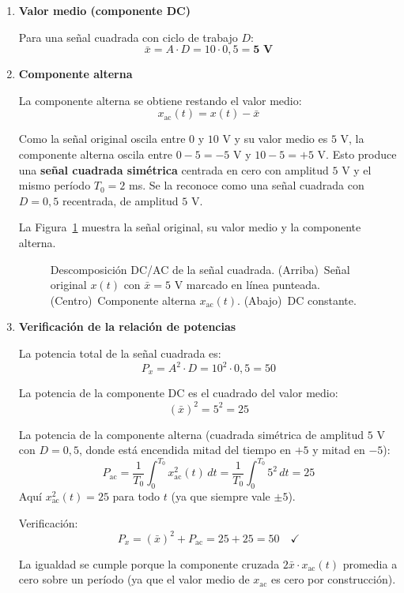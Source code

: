 \documentclass[10pt,a4paper]{article}
\begin{document}
	\begin{enumerate}[label=\textbf{\alph*)}]
		\item \textbf{Valor medio (componente DC)}
		
		Para una señal cuadrada con ciclo de trabajo $D$:
		\[
		\bar{x} = A\cdot D = 10\cdot 0{,}5 = \mathbf{5\text{ V}}
		\]
		
		\item \textbf{Componente alterna}
		
		La componente alterna se obtiene restando el valor medio:
		\[
		x_\mathrm{ac}(t) = x(t) - \bar{x}
		\]
		
		Como la señal original oscila entre $0$ y $10$ V y su valor medio es $5$ V, la componente alterna oscila entre $0 - 5 = -5$ V y $10 - 5 = +5$ V. Esto produce una \textbf{señal cuadrada simétrica} centrada en cero con amplitud $5$ V y el mismo período $T_0 = 2$ ms. Se la reconoce como una señal cuadrada con $D=0{,}5$ recentrada, de amplitud $5$ V.
		
		La Figura~\ref{fig:ejer13} muestra la señal original, su valor medio y la componente alterna.
		
		\begin{figure}[H]
			\centering
			
			\caption{Descomposición DC/AC de la señal cuadrada. (Arriba)~Señal original $x(t)$ con $\bar{x}=5$ V marcado en línea punteada. (Centro)~Componente alterna $x_\mathrm{ac}(t)$. (Abajo)~DC constante.}
			\label{fig:ejer13}
		\end{figure}
		
		\item \textbf{Verificación de la relación de potencias}
		
		La potencia total de la señal cuadrada es:
		\[
		P_x = A^2\cdot D = 10^2\cdot 0{,}5 = 50
		\]
		
		La potencia de la componente DC es el cuadrado del valor medio:
		\[
		(\bar{x})^2 = 5^2 = 25
		\]
		
		La potencia de la componente alterna (cuadrada simétrica de amplitud $5$ V con $D=0{,}5$, donde está encendida mitad del tiempo en $+5$ y mitad en $-5$):
		\[
		P_\mathrm{ac} = \frac{1}{T_0}\int_0^{T_0} x_\mathrm{ac}^2(t)\,dt = \frac{1}{T_0}\int_0^{T_0} 5^2\,dt = 25
		\]
		Aquí $x_\mathrm{ac}^2(t) = 25$ para todo $t$ (ya que siempre vale $\pm 5$).
		
		Verificación:
		\[
		P_x = (\bar{x})^2 + P_\mathrm{ac} = 25 + 25 = 50\quad \checkmark
		\]
		
		La igualdad se cumple porque la componente cruzada $2\bar{x}\cdot x_\mathrm{ac}(t)$ promedia a cero sobre un período (ya que el valor medio de $x_\mathrm{ac}$ es cero por construcción).
	\end{enumerate}
\end{document}
